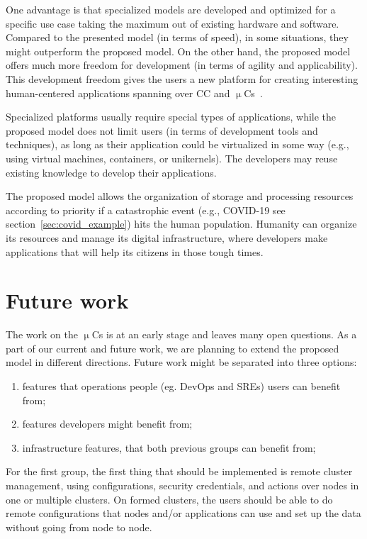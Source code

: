 One advantage is that specialized models are developed and optimized for a specific use case taking the maximum out of existing hardware and software. Compared to the presented model (in terms of speed), in some situations, they might outperform the proposed model. On the other hand, the proposed model offers much more freedom for development (in terms of agility and applicability). This development freedom gives the users a new platform for creating interesting human-centered applications spanning over CC and $\upmu$Cs~\cite{VillariCF17}.

Specialized platforms usually require special types of applications, while the proposed model does not limit users (in terms of development tools and techniques), as long as their application could be virtualized in some way (e.g., using virtual machines, containers, or unikernels). The developers may reuse existing knowledge to develop their applications.

The proposed model allows the organization of storage and processing resources according to priority if a catastrophic event (e.g., COVID-19 see section~\ref{sec:covid_example}) hits the human population. Humanity can organize its resources and manage its digital infrastructure, where developers make applications that will help its citizens in those tough times.
%
%
\section{Future work}\label{sec:future_work}
%
The work on the $\upmu$Cs is at an early stage and leaves many open questions. As a part of our current and future work, we are planning to extend the proposed model in different directions. Future work might be separated into three options:
 
\begin{enumerate}[start=1,label={(\bfseries \arabic*)}]
	\item features that operations people (eg. DevOps and SREs) users can benefit from;
	\item features developers might benefit from;
	\item infrastructure features, that both previous groups can benefit from;
\end{enumerate}

\noindent
For the first group, the first thing that should be implemented is remote cluster management, using configurations, security credentials, and actions over nodes in one or multiple clusters. On formed clusters, the users should be able to do remote configurations that nodes and/or applications can use and set up the data without going from node to node.

